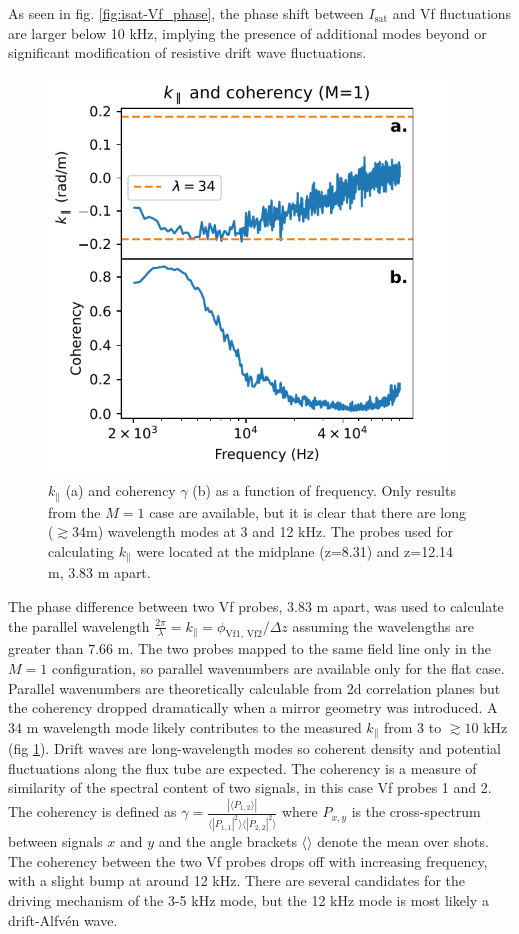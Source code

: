As seen in fig. \ref{fig:isat-Vf_phase}, the phase shift between $I_\text{sat}$ and Vf fluctuations are larger below 10 kHz, implying the presence of additional modes beyond or significant modification of resistive drift wave fluctuations.
\begin{figure}
    \centering
    \includegraphics[width=300pt]{figures/fig11.pdf}
    \caption{$k_\parallel$ (a) and coherency $\gamma$ (b) as a function of frequency. Only results from the $M=1$ case are available, but it is clear that there are long ($\gtrsim 34$m) wavelength modes at 3 and 12 kHz. The probes used for calculating $k_\parallel$ were located at the midplane (z=8.31) and z=12.14 m, 3.83 m apart.}
    \label{fig:kparallel-coherency}
\end{figure}
The phase difference between two Vf probes, $3.83$ m apart, was used to calculate the parallel wavelength $\frac{2 \pi}{\lambda} = k_\parallel = \phi_{\text{Vf1, Vf2}} / \Delta z$ assuming the wavelengths are greater than $7.66$ m. The two probes mapped to the same field line only in the $M=1$ configuration, so parallel wavenumbers are available only for the flat case. Parallel wavenumbers are theoretically calculable from 2d correlation planes but the coherency dropped dramatically when a mirror geometry was introduced.
A $34$ m wavelength mode likely contributes to the measured $k_\parallel$ from $3$ to  $\gtrsim 10$ kHz (fig \ref{fig:kparallel-coherency}). Drift waves are long-wavelength modes so coherent density and potential fluctuations along the flux tube are expected. The coherency is a measure of similarity of the spectral content of two signals, in this case Vf probes 1 and 2. The coherency is defined as $\gamma = \frac{|\langle P_{1,2} \rangle|}{\langle |P_{1,1}|^2 \rangle \langle |P_{2,2}|^2 \rangle}$ where $P_{x,y}$ is the cross-spectrum between signals $x$ and $y$ and the angle brackets $\langle \rangle$ denote the mean over shots. The coherency between the two Vf probes drops off with increasing frequency, with a slight bump at around 12 kHz. There are several candidates for the driving mechanism of the 3-5 kHz mode, but the 12 kHz mode is most likely a drift-Alfvén wave.

